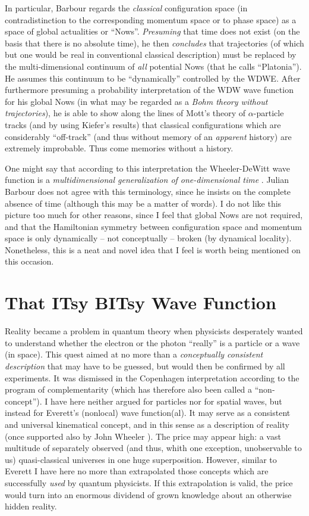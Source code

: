 \documentclass[12pt]{article}
\begin{document}
In particular, Barbour regards the {\it classical} configuration space
(in contradistinction to the corresponding momentum space or to phase
space) as a space of global actualities or ``Nows''. {\it Presuming}
that time does not exist (on the basis that there is no absolute
time), he then {\it concludes} that trajectories (of which but one
would be real in conventional classical description) must be replaced
by the multi-dimensional continuum of {\it all} potential Nows (that
he calls ``Platonia''). He assumes this continuum to be
``dynamically'' controlled by the WDWE. After furthermore presuming a
probability interpretation of the WDW wave function for his global
Nows (in what may be regarded as a {\it Bohm theory without
trajectories}), he is able to show along the lines of Mott's
theory of
$\alpha$-particle tracks (and by using Kiefer's results) that classical
configurations which are considerably ``off-track'' (and thus without
memory of an {\it apparent} history) are extremely improbable. Thus
come memories without a history.

One might say
that according to this interpretation the Wheeler-DeWitt wave function
is a {\it multidimensional generalization of one-dimensional
time} \cite{TD}. Julian Barbour does not agree with this terminology,
since he insists on the complete absence of time (although this may be
a matter of words). I do not like this picture too much for other
reasons, since I feel that global Nows are not required, and that the
Hamiltonian symmetry between configuration space and momentum space is
only dynamically -- not conceptually -- broken (by dynamical
locality). Nonetheless, this is a neat and novel idea that I feel
is worth being mentioned on this occasion.

\section{That ITsy BITsy Wave Function}
Reality became a problem in quantum theory when physicists desperately
wanted to understand whether the electron or the photon ``really'' is
a particle or a wave (in space). This quest aimed at no more than a
{\it conceptually consistent description} that may have to be
guessed, but would then be confirmed by all experiments. It was
dismissed in the Copenhagen interpretation according to the program  of
complementarity (which has therefore also been called a
``non-concept'').  I have here neither argued for particles nor for
spatial waves, but instead for Everett's (nonlocal) wave function(al).
It may serve as a consistent and universal kinematical concept, and in
this sense as a description of reality  (once supported also by John
Wheeler
\cite{WhRevModPhys}).  The price may appear high: a vast multitude of
separately observed (and thus, whith one exception, unobservable to us)
quasi-classical universes in one huge superposition. However, similar
to Everett I have here no more than extrapolated those concepts which
are successfully {\it used} by quantum physicists. If this
extrapolation is valid, the price would turn into an enormous dividend
of grown knowledge about an otherwise hidden reality.
\end{document}
